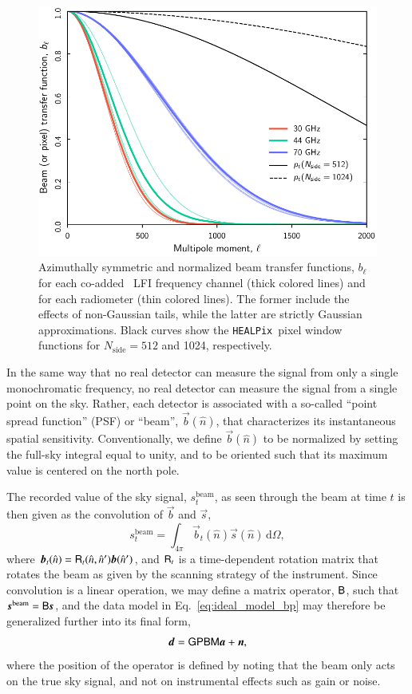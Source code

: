 \documentclass[twocolumn]{aa}
\renewcommand{\d}[0]{\vec{d}}
\newcommand{\n}[0]{\vec{n}}
\newcommand{\s}[0]{\vec{s}}
\renewcommand{\a}[0]{\vec{a}}
\newcommand{\B}[0]{\tens{B}}
\renewcommand{\b}[0]{\vec{b}}
\newcommand{\M}[0]{\tens{M}}
\renewcommand{\P}[0]{\tens{P}}
\newcommand{\R}[0]{\tens{R}}
\renewcommand{\G}[0]{\tens{G}}
\newcommand{\HEALPix}[0]{\texttt{HEALPix}}
\begin{document}
\begin{figure}[t]
  \center
  \includegraphics[width=\linewidth]{figs/beam_bl.pdf}
  \caption{Azimuthally symmetric and normalized beam transfer
    functions, $b_{\ell}$ for each co-added \Planck\ LFI frequency
    channel (thick colored lines) and for each radiometer (thin
    colored lines). The former include the effects of non-Gaussian
    tails, while the latter are strictly Gaussian
    approximations. Black curves show the \HEALPix\ pixel window
    functions for $N_{\mathrm{side}}=512$ and 1024, respectively.}
  \label{fig:bl_LFI}
\end{figure}

In the same way that no real detector can measure the signal from only
a single monochromatic frequency, no real detector can measure the
signal from a single point on the sky. Rather, each detector is
associated with a so-called ``point spread function'' (PSF) or
``beam'', $\b(\hat{n})$, that characterizes its instantaneous spatial
sensitivity. Conventionally, we define $\b(\hat{n})$ to be normalized
by setting the full-sky integral equal to unity, and to be oriented such that
its maximum value is centered on the north pole.

The recorded value of the sky signal, $s^{\mathrm{beam}}_t$, as seen
through the beam at time $t$ is then given as the convolution of $\b$
and $\s$,
\begin{equation}
  s^{\mathrm{beam}}_t = \int_{4\pi} \b_t(\hat{n})\s(\hat{n})
  \,\mathrm d\Omega,
  \label{eq:beam_conv}
\end{equation}
where $\b_t(\hat{n})=\R_t(\hat{n},\hat{n}')\b(\hat{n}')$, and $\R_t$
is a time-dependent rotation matrix that rotates the beam as given by
the scanning strategy of the instrument. Since convolution is a linear
operation, we may define a matrix operator, $\B$, such that
$\s^{\mathrm{beam}} = \B\s$, and the data model in
Eq.~\eqref{eq:ideal_model_bp} may therefore be generalized further into
its final form,
\begin{equation}
  \d = \G\P\B\M\a + \n,
  \label{eq:ideal_model_final}
\end{equation}
where the position of the operator is defined by noting that the beam
only acts on the true sky signal, and not on instrumental effects such
as gain or noise.
\end{document}
